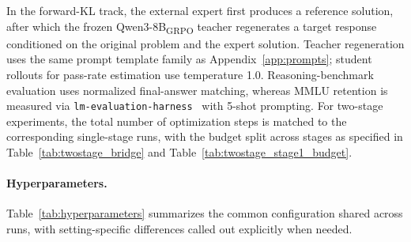 \documentclass{article}
\begin{document}
In the forward-KL track, the external expert first produces a reference solution, after which the frozen Qwen3-8B\textsubscript{GRPO} teacher regenerates a target response conditioned on the original problem and the expert solution. Teacher regeneration uses the same prompt template family as Appendix~\ref{app:prompts}; student rollouts for pass-rate estimation use temperature 1.0. Reasoning-benchmark evaluation uses normalized final-answer matching, whereas MMLU retention is measured via \texttt{lm-evaluation-harness}~\citep{eval-harness} with 5-shot prompting. For two-stage experiments, the total number of optimization steps is matched to the corresponding single-stage runs, with the budget split across stages as specified in Table~\ref{tab:twostage_bridge} and Table~\ref{tab:twostage_stage1_budget}.

\paragraph{Hyperparameters.}
Table~\ref{tab:hyperparameters} summarizes the common configuration shared across runs, with setting-specific differences called out explicitly when needed.
\end{document}
